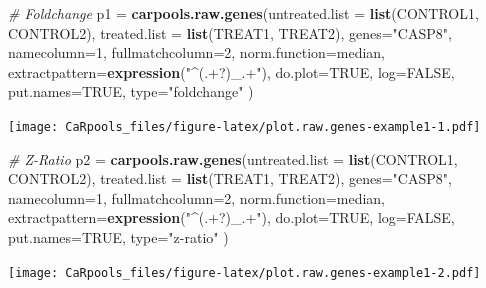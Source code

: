 \documentclass[]{article}
\newenvironment{Shaded}{\begin{snugshade}}{\end{snugshade}}
\newcommand{\KeywordTok}[1]{\textcolor[rgb]{0.13,0.29,0.53}{\textbf{{#1}}}}
\newcommand{\DataTypeTok}[1]{\textcolor[rgb]{0.13,0.29,0.53}{{#1}}}
\newcommand{\DecValTok}[1]{\textcolor[rgb]{0.00,0.00,0.81}{{#1}}}
\newcommand{\StringTok}[1]{\textcolor[rgb]{0.31,0.60,0.02}{{#1}}}
\newcommand{\CommentTok}[1]{\textcolor[rgb]{0.56,0.35,0.01}{\textit{{#1}}}}
\newcommand{\OtherTok}[1]{\textcolor[rgb]{0.56,0.35,0.01}{{#1}}}
\newcommand{\NormalTok}[1]{{#1}}
\begin{document}
\begin{Shaded}
\begin{Highlighting}[]
\CommentTok{# Foldchange}
\NormalTok{p1 =}\StringTok{ }\KeywordTok{carpools.raw.genes}\NormalTok{(}\DataTypeTok{untreated.list =} \KeywordTok{list}\NormalTok{(CONTROL1, CONTROL2),}
  \DataTypeTok{treated.list =} \KeywordTok{list}\NormalTok{(TREAT1, TREAT2), }\DataTypeTok{genes=}\StringTok{"CASP8"}\NormalTok{, }\DataTypeTok{namecolumn=}\DecValTok{1}\NormalTok{,}
  \DataTypeTok{fullmatchcolumn=}\DecValTok{2}\NormalTok{, }\DataTypeTok{norm.function=}\NormalTok{median, }\DataTypeTok{extractpattern=}\KeywordTok{expression}\NormalTok{(}\StringTok{"^(.+?)_.+"}\NormalTok{), }
  \DataTypeTok{do.plot=}\OtherTok{TRUE}\NormalTok{, }\DataTypeTok{log=}\OtherTok{FALSE}\NormalTok{, }\DataTypeTok{put.names=}\OtherTok{TRUE}\NormalTok{, }\DataTypeTok{type=}\StringTok{"foldchange"} \NormalTok{)}
\end{Highlighting}
\end{Shaded}

\texttt{[image: CaRpools\_files/figure-latex/plot.raw.genes-example1-1.pdf]}

\begin{Shaded}
\begin{Highlighting}[]
\CommentTok{# Z-Ratio}
\NormalTok{p2 =}\StringTok{ }\KeywordTok{carpools.raw.genes}\NormalTok{(}\DataTypeTok{untreated.list =} \KeywordTok{list}\NormalTok{(CONTROL1, CONTROL2),}
  \DataTypeTok{treated.list =} \KeywordTok{list}\NormalTok{(TREAT1, TREAT2), }\DataTypeTok{genes=}\StringTok{"CASP8"}\NormalTok{, }\DataTypeTok{namecolumn=}\DecValTok{1}\NormalTok{,}
  \DataTypeTok{fullmatchcolumn=}\DecValTok{2}\NormalTok{, }\DataTypeTok{norm.function=}\NormalTok{median, }\DataTypeTok{extractpattern=}\KeywordTok{expression}\NormalTok{(}\StringTok{"^(.+?)_.+"}\NormalTok{), }
  \DataTypeTok{do.plot=}\OtherTok{TRUE}\NormalTok{, }\DataTypeTok{log=}\OtherTok{FALSE}\NormalTok{, }\DataTypeTok{put.names=}\OtherTok{TRUE}\NormalTok{, }\DataTypeTok{type=}\StringTok{"z-ratio"} \NormalTok{)}
\end{Highlighting}
\end{Shaded}

\texttt{[image: CaRpools\_files/figure-latex/plot.raw.genes-example1-2.pdf]}
\end{document}
